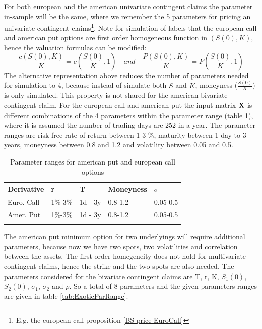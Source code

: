 For both european and the american univariate contingent claims the parameter in-sample will be the same, where we remember the 5 parameters for pricing an  univariate contingent claims\footnote{E.g. the european call proposition \ref{BS-price-EuroCall}}. Note for simulation of labels that the european call and american put options are first order homogeneous function in $(S(0),K)$, hence the valuation formulas can be modified:
$$\frac{c(S(0),K)}{K}=c(\frac{S(0)}{K},1) \quad and \quad \frac{P(S(0),K)}{K}=P(\frac{S(0)}{K},1)$$
The alternative representation above reduces the number of parameters needed for simulation to 4, because instead of simulate both $S$ and $K$, moneyness ($\frac{S(0)}{K}$) is only  simulated. This property is not shared for the american bivariate contingent claim. For the european call and american put the input matrix $\mathbf{X}$ is different combinations of the 4 parameters within the parameter range (table \ref{tab:vanillaParRange}), where it is assumed the number of trading days are 252 in a year. The parameter ranges are risk free rate of return between 1-3 \%, maturity between 1 day to 3 years, moneyness between 0.8 and 1.2 and volatility between 0.05 and 0.5. \\

\begin{table}[th]
\caption[Parameter Ranges For MLPs]{Parameter ranges for american put and european call options}
\label{tab:vanillaParRange}
\centering
\begin{tabular}{l l l l l}
\toprule
\textbf{Derivative} & \textbf{r} & \textbf{T} & \textbf{Moneyness} & $\sigma$ \\
\midrule
Euro. Call & 1\%-3\% & 1d - 3y & 0.8-1.2 & 0.05-0.5\\ 
Amer. Put & 1\%-3\% & 1d - 3y & 0.8-1.2 & 0.05-0.5\\ 
\bottomrule\\
\end{tabular}
\end{table}

The american put minimum option for two underlyings will require additional parameters, because now we have two spots, two volatilities and correlation between the assets. The first order homegeneity does not hold for multivariate contingent claims, hence the strike and the two spots are also needed. The parameters considered for the bivariate contingent claims are T, r, K, $S_1(0)$, $S_2(0)$, $\sigma_1$, $\sigma_2$ and $\rho$. So a total of 8 parameters and the given parameters ranges are given in table \ref{tab:ExoticParRange}.\\
   
